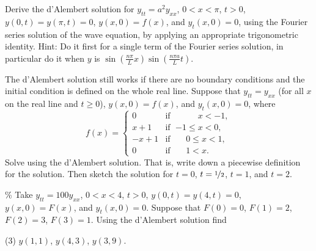 \documentclass{ximera}
\begin{document}
\begin{exercise}
    Derive the d'Alembert solution for $y_{tt} = a^2 y_{xx}$, $0 < x < \pi$, $t > 0$, $y(0,t) = y(\pi, t) = 0$, $y(x,0) = f(x)$, and $y_t(x,0) = 0$, using the Fourier series solution of the wave equation, by applying an appropriate trigonometric identity. Hint: Do it first for a single term of the Fourier series solution, in particular do it when $y$ is $\sin\left(\frac{n \pi}{L} x \right)\sin\left(\frac{n \pi a}{L} t \right)$.
\end{exercise}

\begin{exercise}
    The d'Alembert solution still works if there are no boundary conditions and the initial condition is defined on the whole real line.  Suppose that $y_{tt} = y_{xx}$ (for all $x$ on the real line and $t \geq 0$), $y(x,0) = f(x)$, and $y_t(x,0) = 0$, where
    \begin{equation*}
        f(x) =
        \begin{cases}
            0 & \text{if } \; \phantom{{-1} \leq {} }x < -1, \\
            x+1 & \text{if } \; {-1} \leq x < 0, \\
            -x+1 & \text{if } \; \phantom{-}0 \leq x < 1, \\
            0 & \text{if } \; \phantom{-}1 < x .
        \end{cases}
    \end{equation*}
    Solve using the d'Alembert solution. That is, write down a piecewise definition for the solution.  Then sketch the solution for $t=0$, $t=\nicefrac{1}{2}$, $t=1$, and $t=2$.
\end{exercise}

\begin{exercise}\%
    Take $y_{tt} = 100y_{xx}$, $0 < x < 4$, $t > 0$, $y(0,t) = y(4, t) = 0$, $y(x,0) = F(x)$, and $y_t(x,0) = 0$. Suppose that $F(0)=0$, $F(1)=2$, $F(2)=3$, $F(3)=1$. Using the d'Alembert solution find
    \begin{tasks}(3)
        \task $y(1,1)$,
        \task $y(4,3)$,
        \task $y(3,9)$.
    \end{tasks}
\end{exercise}
%
\end{document}
